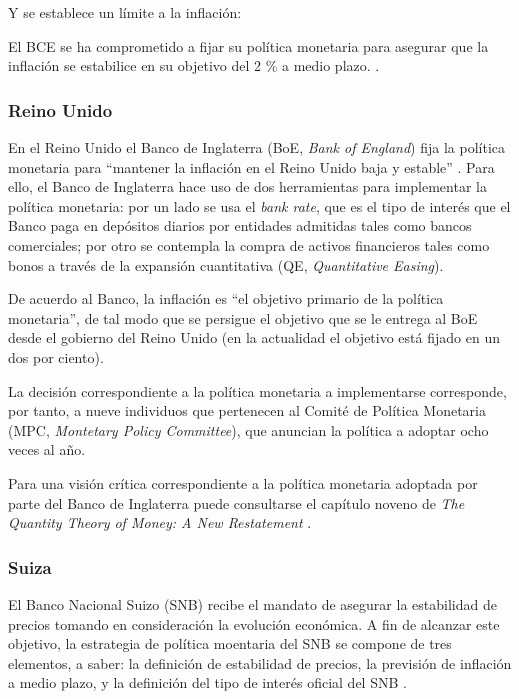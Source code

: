\documentclass[titlepage, 12pt]{article}
\begin{document}
Y se establece un límite a la inflación:
\begin{displayquote}
    El BCE se ha comprometido a fijar su política monetaria para asegurar que la inflación se estabilice en su objetivo del 2 \% a medio plazo. \autocite{ecb2021}.
\end{displayquote}

\subsubsection{Reino Unido}

En el Reino Unido el Banco de Inglaterra (BoE, \textit{Bank of England}) fija la política monetaria para \enquote{mantener la inflación en el Reino Unido baja y estable} \autocite{boe}. Para ello, el Banco de Inglaterra hace uso de dos herramientas para implementar la política monetaria: por un lado se usa el \textit{bank rate}, que es el tipo de interés que el Banco paga en depósitos diarios por entidades admitidas tales como bancos comerciales; por otro se contempla la compra de activos financieros tales como bonos a través de la expansión cuantitativa (QE, \textit{Quantitative Easing}).

De acuerdo al Banco, la inflación es \enquote{el objetivo primario de la política monetaria}, de tal modo que se persigue el objetivo que se le entrega al BoE desde el gobierno del Reino Unido (en la actualidad el objetivo está fijado en un dos por ciento).

La decisión correspondiente a la política monetaria a implementarse corresponde, por tanto, a nueve individuos que pertenecen al Comité de Política Monetaria (MPC, \textit{Montetary Policy Committee}), que anuncian la política a adoptar ocho veces al año.

Para una visión crítica correspondiente a la política monetaria adoptada por parte del Banco de Inglaterra puede consultarse el capítulo noveno de \textit{The Quantity Theory of Money: A New Restatement} \autocite[109-129]{congdon2024}.

\subsubsection{Suiza}

El Banco Nacional Suizo (SNB) recibe el mandato de asegurar la estabilidad de precios tomando en consideración la evolución económica. A fin de alcanzar este objetivo, la estrategia de política moentaria del SNB se compone de tres elementos, a saber: la definición de estabilidad de precios, la previsión de inflación a medio plazo, y la definición del tipo de interés oficial del SNB \autocite{snb2024a}.
\end{document}
